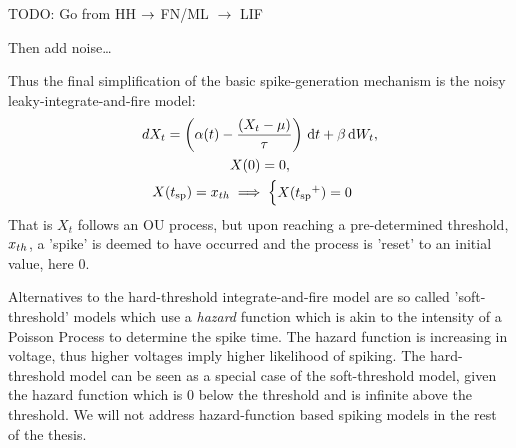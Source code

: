 TODO: Go from HH ${\rightarrow}$ FN/ML  $\rightarrow$ LIF

Then add noise\ldots

Thus the final simplification of the basic spike-generation mechanism is the
noisy leaky-integrate-and-fire model: 
\begin{equation}
\begin{gathered}
dX_t = \left(\alpha(t) - \frac{(X_t - {\mu })}{{ \tau }} \right) \, \mathrm{d} t + \beta \, \mathrm{d} W_t,
\\
X(0) = 0,
\\
X({ t_{\textrm{sp} } }) = { x_{th} } \implies  
\begin{cases}
X({ t_{\textrm{sp} } }^+) = 0 &  
\end{cases}
\end{gathered}
\label{eq:X_evolution_uo}
\end{equation}
That is $X_t$ follows an OU process, but upon reaching a pre-determined
threshold, ${ x_{th} }$, a 'spike' is deemed to have occurred and the process is 'reset' to an
initial value, here $0$.

Alternatives to the hard-threshold integrate-and-fire model are so called
'soft-threshold' models which use a {\sl hazard} function which is akin to the
intensity of a Poisson Process to determine the spike time. The hazard function
is increasing in voltage, thus higher voltages imply higher likelihood of
spiking. The hard-threshold model can be seen as a special case of the
soft-threshold model, given the hazard function which is 0 below the threshold
and is infinite above the threshold. We will not address hazard-function based
spiking models in the rest of the thesis. 
